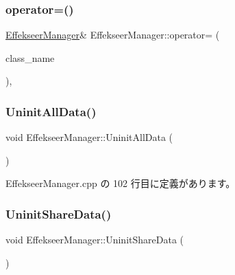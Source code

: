 \subsubsection{\texorpdfstring{operator=()}{operator=()}}
{\footnotesize\ttfamily \mbox{\hyperlink{class_effekseer_manager}{Effekseer\+Manager}}\& Effekseer\+Manager\+::operator= (\begin{DoxyParamCaption}\item[{const \mbox{\hyperlink{class_effekseer_manager}{Effekseer\+Manager}} \&}]{class\+\_\+name }\end{DoxyParamCaption})\hspace{0.3cm}{\ttfamily [private]}, {\ttfamily [delete]}}

\mbox{\label{class_effekseer_manager_aa9f5c911182097238d979cc628f2dc13}} 
\subsubsection{\texorpdfstring{Uninit\+All\+Data()}{UninitAllData()}}
{\footnotesize\ttfamily void Effekseer\+Manager\+::\+Uninit\+All\+Data (\begin{DoxyParamCaption}{ }\end{DoxyParamCaption})\hspace{0.3cm}{\ttfamily [static]}}



 Effekseer\+Manager.\+cpp の 102 行目に定義があります。

\mbox{\label{class_effekseer_manager_ab83021d09eeeaba41852c8db2f07fe55}} 
\subsubsection{\texorpdfstring{Uninit\+Share\+Data()}{UninitShareData()}}
{\footnotesize\ttfamily void Effekseer\+Manager\+::\+Uninit\+Share\+Data (\begin{DoxyParamCaption}{ }\end{DoxyParamCaption})\hspace{0.3cm}{\ttfamily [static]}}




